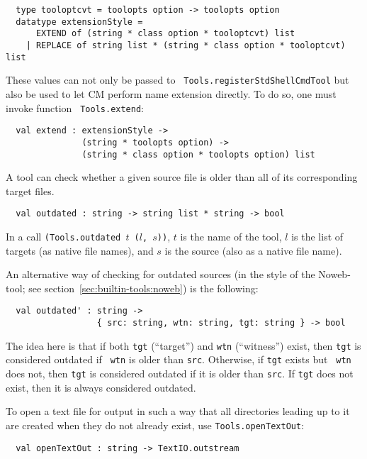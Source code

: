\begin{verbatim}
  type tooloptcvt = toolopts option -> toolopts option
  datatype extensionStyle =
      EXTEND of (string * class option * tooloptcvt) list
    | REPLACE of string list * (string * class option * tooloptcvt) list
\end{verbatim}

These values can not only be passed to {\tt
Tools.registerStdShellCmdTool} but also be used to let CM perform name
extension directly.  To do so, one must invoke function {\tt
Tools.extend}:

\begin{verbatim}
  val extend : extensionStyle ->
               (string * toolopts option) ->
               (string * class option * toolopts option) list
\end{verbatim}

 A tool can check whether a given
source file is older than all of its corresponding target files.

\begin{verbatim}
  val outdated : string -> string list * string -> bool
\end{verbatim}

In a call {\tt (Tools.outdated $t$ ($l$, $s$))}, $t$ is the name of
the tool, $l$ is the list of targets (as native file names),
and $s$ is the source (also as a native file name).

An alternative way of checking for outdated sources (in the style of
the Noweb-tool; see section~\ref{sec:builtin-tools:noweb}) is the
following:

\begin{verbatim}
  val outdated' : string ->
                  { src: string, wtn: string, tgt: string } -> bool
\end{verbatim}

The idea here is that if both {\tt tgt} (``target'') and {\tt wtn}
(``witness'') exist, then {\tt tgt} is considered outdated if {\tt
wtn} is older than {\tt src}.  Otherwise, if {\tt tgt} exists but {\tt
wtn} does not, then {\tt tgt} is considered outdated if it is older
than {\tt src}.  If {\tt tgt} does not exist, then it is always
considered outdated.

  To open a text file for
output in such a way that all directories leading up to it are created
when they do not already exist, use {\tt Tools.openTextOut}:

\begin{verbatim}
  val openTextOut : string -> TextIO.outstream
\end{verbatim}

